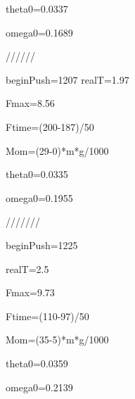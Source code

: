 \documentclass[a4paper,14pt]{article}
\theoremstyle{plain} %
\theoremstyle{definition} %
\theoremstyle{remark} %
\begin{document}
{theta0=0.0337

omega0=0.1689

//////

beginPush=1207
realT=1.97

Fmax=8.56

Ftime=(200-187)/50

Mom=(29-0)*m*g/1000

theta0=0.0335

omega0=0.1955

///////

beginPush=1225

realT=2.5

Fmax=9.73

Ftime=(110-97)/50

Mom=(35-5)*m*g/1000

theta0=0.0359

omega0=0.2139

}
\end{document}
